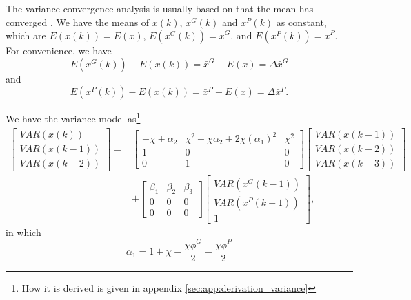 The variance convergence analysis is usually based on that the mean has converged \cite{Jiang20078} \cite{Poli:2007:EAS:1276958.1276977}.
We have the means of $ x(k) $, $ x^{G}(k) $ and $ x^{P}(k) $ as constant, which are $ E(x(k)) = E(x) $, $  E(x^{G}(k)) = \bar{x}^{G} $. and $ E(x^{P}(k)) = \bar{x}^{P} $. 
For convenience, we have
\begin{equation}
\label{eq:def_delta_mean_xg}
E(x^{G}(k)) - E(x(k)) =  \bar{x}^{G} - E(x) = \Delta \bar{x}^{G}
\end{equation}
and
\begin{equation}
\label{eq:def_delta_mean_xp}
E(x^{P}(k)) - E(x(k)) =  \bar{x}^{P} - E(x) = \Delta \bar{x}^{P}.
\end{equation}

We have the variance model as\footnote{How it is derived is given in appendix \ref{sec:app:derivation_variance} }
\begin{equation}
\label{eq:pso1_alg_var_linalg}
\begin{aligned}
\begin{bmatrix}
VAR( x(k) ) \\
VAR( x(k-1) ) \\
VAR( x(k-2) ) 
\end{bmatrix}
= &
\begin{bmatrix}
- \chi + \alpha_{2}  &  \chi^{2} + \chi \alpha_{2} + 2 \chi ( \alpha_{1} )^{2}  & \chi^{2} \\
1 & 0 & 0 \\
0 & 1 & 0
\end{bmatrix}
\begin{bmatrix}
VAR( x(k-1) ) \\
VAR( x(k-2) ) \\
VAR( x(k-3) ) 
\end{bmatrix}
\\ & +
\begin{bmatrix}
\beta_{1} & \beta_{2} & \beta_{3} \\
0 & 0 & 0 \\
0 & 0 & 0
\end{bmatrix}
\begin{bmatrix}
VAR( x^{G}(k-1) ) \\
VAR( x^{P}(k-1) ) \\
1
\end{bmatrix},
\end{aligned}
\end{equation}
in which
\begin{equation}
\label{eq:def_param_alpha1}
\alpha_{1} = 1 + \chi - \frac{ \chi \phi^{G} }{2} - \frac{ \chi \phi^{P} }{2}
\end{equation}
